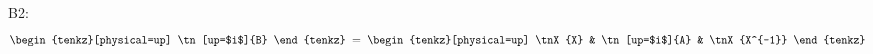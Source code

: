 \documentclass[varwidth=16cm, border=6pt]{standalone}
\begin{document}
B2:
\[
  \begin{tenkz}[physical=up]
    \tn[up=$i$]{B}
  \end{tenkz}
  \;=\;
  \begin{tenkz}[physical=up]
    \tnX{X} & \tn[up=$i$]{A} & \tnX{X^{-1}}
  \end{tenkz}
\]
\end{document}
